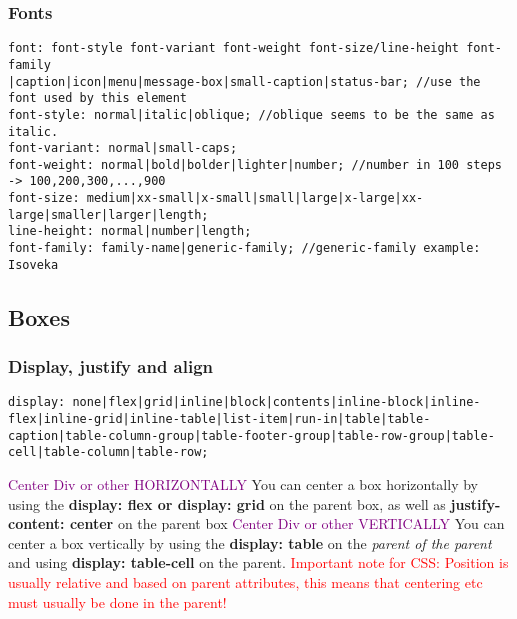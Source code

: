\documentclass[main.tex,fontsize=6pt,paper=a4,paper=landscape,DIV=calc,]{scrartcl}
\begin{document}
\begin{multicols*}{4}
\subsubsection{Fonts}
\vspace{-2mm}
\begin{lstlisting}
font: font-style font-variant font-weight font-size/line-height font-family
|caption|icon|menu|message-box|small-caption|status-bar; //use the font used by this element
font-style: normal|italic|oblique; //oblique seems to be the same as italic.
font-variant: normal|small-caps;
font-weight: normal|bold|bolder|lighter|number; //number in 100 steps -> 100,200,300,...,900
font-size: medium|xx-small|x-small|small|large|x-large|xx-large|smaller|larger|length;
line-height: normal|number|length;
font-family: family-name|generic-family; //generic-family example: Isoveka
\end{lstlisting}
\vspace{2mm}

\subsection{Boxes}
\subsubsection{Display, justify and align}
\vspace{-2mm}
\begin{lstlisting}
display: none|flex|grid|inline|block|contents|inline-block|inline-flex|inline-grid|inline-table|list-item|run-in|table|table-caption|table-column-group|table-footer-group|table-row-group|table-cell|table-column|table-row;
\end{lstlisting}
\vspace{2mm}
\textcolor{purple}{Center Div or other HORIZONTALLY}\newline 
You can center a box horizontally by using the \textbf{display: flex or display: grid} on the parent box, as well as \textbf{justify-content: center} on the parent box\newline
\textcolor{purple}{Center Div or other VERTICALLY}\newline 
You can center a box vertically by using the \textbf{display: table} on the \emph{parent of the parent} and using \textbf{display: table-cell} on the parent.\newline 
\textcolor{red}{Important note for CSS: Position is usually relative and based on parent attributes, this means that centering etc must usually be done in the parent!}


\end{multicols*}
\end{document}
